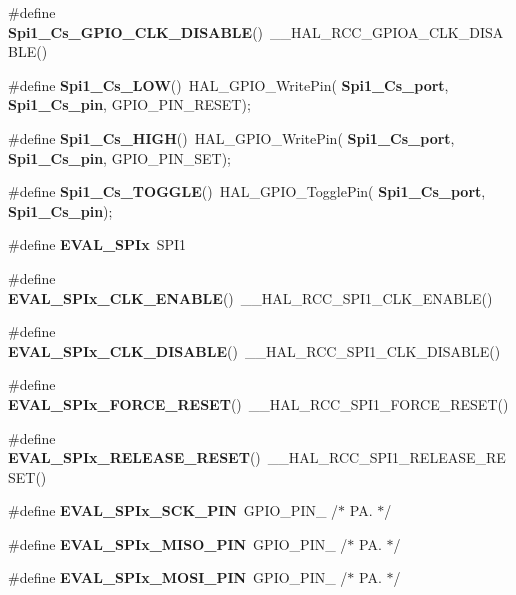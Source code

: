 \begin{DoxyCompactItemize}
\item 
\#define \textbf{ Spi1\+\_\+\+Cs\+\_\+\+G\+P\+I\+O\+\_\+\+C\+L\+K\+\_\+\+D\+I\+S\+A\+B\+LE}()~\+\_\+\+\_\+\+H\+A\+L\+\_\+\+R\+C\+C\+\_\+\+G\+P\+I\+O\+A\+\_\+\+C\+L\+K\+\_\+\+D\+I\+S\+A\+B\+LE()
\item 
\#define \textbf{ Spi1\+\_\+\+Cs\+\_\+\+L\+OW}()~H\+A\+L\+\_\+\+G\+P\+I\+O\+\_\+\+Write\+Pin(\textbf{ Spi1\+\_\+\+Cs\+\_\+port},\textbf{ Spi1\+\_\+\+Cs\+\_\+pin}, G\+P\+I\+O\+\_\+\+P\+I\+N\+\_\+\+R\+E\+S\+ET);
\item 
\#define \textbf{ Spi1\+\_\+\+Cs\+\_\+\+H\+I\+GH}()~H\+A\+L\+\_\+\+G\+P\+I\+O\+\_\+\+Write\+Pin(\textbf{ Spi1\+\_\+\+Cs\+\_\+port},\textbf{ Spi1\+\_\+\+Cs\+\_\+pin}, G\+P\+I\+O\+\_\+\+P\+I\+N\+\_\+\+S\+ET);
\item 
\#define \textbf{ Spi1\+\_\+\+Cs\+\_\+\+T\+O\+G\+G\+LE}()~H\+A\+L\+\_\+\+G\+P\+I\+O\+\_\+\+Toggle\+Pin(\textbf{ Spi1\+\_\+\+Cs\+\_\+port},\textbf{ Spi1\+\_\+\+Cs\+\_\+pin});
\item 
\#define \textbf{ E\+V\+A\+L\+\_\+\+S\+P\+Ix}~S\+P\+I1
\item 
\#define \textbf{ E\+V\+A\+L\+\_\+\+S\+P\+Ix\+\_\+\+C\+L\+K\+\_\+\+E\+N\+A\+B\+LE}()~\+\_\+\+\_\+\+H\+A\+L\+\_\+\+R\+C\+C\+\_\+\+S\+P\+I1\+\_\+\+C\+L\+K\+\_\+\+E\+N\+A\+B\+LE()
\item 
\#define \textbf{ E\+V\+A\+L\+\_\+\+S\+P\+Ix\+\_\+\+C\+L\+K\+\_\+\+D\+I\+S\+A\+B\+LE}()~\+\_\+\+\_\+\+H\+A\+L\+\_\+\+R\+C\+C\+\_\+\+S\+P\+I1\+\_\+\+C\+L\+K\+\_\+\+D\+I\+S\+A\+B\+LE()
\item 
\#define \textbf{ E\+V\+A\+L\+\_\+\+S\+P\+Ix\+\_\+\+F\+O\+R\+C\+E\+\_\+\+R\+E\+S\+ET}()~\+\_\+\+\_\+\+H\+A\+L\+\_\+\+R\+C\+C\+\_\+\+S\+P\+I1\+\_\+\+F\+O\+R\+C\+E\+\_\+\+R\+E\+S\+ET()
\item 
\#define \textbf{ E\+V\+A\+L\+\_\+\+S\+P\+Ix\+\_\+\+R\+E\+L\+E\+A\+S\+E\+\_\+\+R\+E\+S\+ET}()~\+\_\+\+\_\+\+H\+A\+L\+\_\+\+R\+C\+C\+\_\+\+S\+P\+I1\+\_\+\+R\+E\+L\+E\+A\+S\+E\+\_\+\+R\+E\+S\+ET()
\item 
\#define \textbf{ E\+V\+A\+L\+\_\+\+S\+P\+Ix\+\_\+\+S\+C\+K\+\_\+\+P\+IN}~G\+P\+I\+O\+\_\+\+P\+I\+N\+\_                  /$\ast$ P\+A. $\ast$/
\item 
\#define \textbf{ E\+V\+A\+L\+\_\+\+S\+P\+Ix\+\_\+\+M\+I\+S\+O\+\_\+\+P\+IN}~G\+P\+I\+O\+\_\+\+P\+I\+N\+\_                  /$\ast$ P\+A. $\ast$/
\item 
\#define \textbf{ E\+V\+A\+L\+\_\+\+S\+P\+Ix\+\_\+\+M\+O\+S\+I\+\_\+\+P\+IN}~G\+P\+I\+O\+\_\+\+P\+I\+N\+\_                  /$\ast$ P\+A. $\ast$/
\item 

\end{DoxyCompactItemize}
